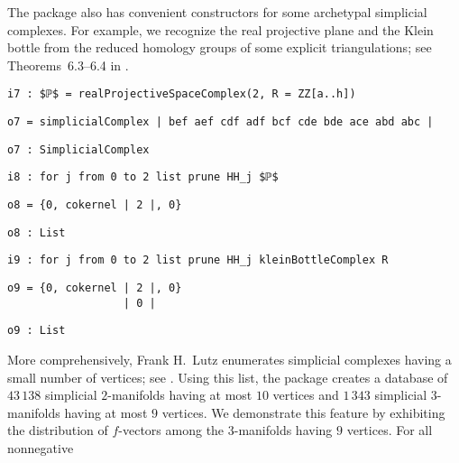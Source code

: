 \documentclass[12pt,leqno]{amsart}
\theoremstyle{definition}
\begin{document}
The package also has convenient constructors for some archetypal simplicial
complexes. For example, we recognize the real projective plane
and the Klein bottle from the reduced homology groups of some explicit
triangulations; see Theorems~6.3--6.4 in \cite{Munkres}.
\begin{lstlisting}[xleftmargin=10pt, lineskip=-5pt, aboveskip=3.0pt, belowskip=1.5pt]
i7 : $ℙ$ = realProjectiveSpaceComplex(2, R = ZZ[a..h])
\end{lstlisting}
\begin{lstlisting}[xleftmargin=10pt, aboveskip=1.5pt, belowskip=1.5pt]
o7 = simplicialComplex | bef aef cdf adf bcf cde bde ace abd abc |
\end{lstlisting}
\begin{lstlisting}[xleftmargin=10pt, aboveskip=1.5pt, belowskip=1.5pt]
o7 : SimplicialComplex
\end{lstlisting}
\begin{lstlisting}[xleftmargin=10pt, aboveskip=1.5pt, belowskip=1.5pt]
i8 : for j from 0 to 2 list prune HH_j $ℙ$
\end{lstlisting}
\begin{lstlisting}[xleftmargin=10pt, aboveskip=1.5pt, belowskip=1.5pt]
o8 = {0, cokernel | 2 |, 0}
\end{lstlisting}
\begin{lstlisting}[xleftmargin=10pt, aboveskip=1.5pt, belowskip=1.5pt]
o8 : List
\end{lstlisting}
\begin{lstlisting}[xleftmargin=10pt, aboveskip=1.5pt, belowskip=1.5pt]
i9 : for j from 0 to 2 list prune HH_j kleinBottleComplex R
\end{lstlisting}
\begin{lstlisting}[xleftmargin=10pt, lineskip=-10pt, aboveskip=4pt, belowskip=1.5pt]
o9 = {0, cokernel | 2 |, 0}
                  | 0 |
\end{lstlisting}
\begin{lstlisting}[xleftmargin=10pt, aboveskip=-5pt, belowskip=3.0pt]
o9 : List
\end{lstlisting}
More comprehensively, Frank H.~Lutz enumerates simplicial complexes having a
small number of vertices; see \cite{LutzM}.  Using this list, the package
creates a database of $43\,138$ simplicial $2$\nobreakdash-manifolds having at
most $10$ vertices and $1\,343$ simplicial $3$-manifolds having at most $9$
vertices.  We demonstrate this feature by exhibiting the distribution of
$f\!$-vectors among the $3$-manifolds having $9$ vertices.  For all nonnegative
\end{document}
